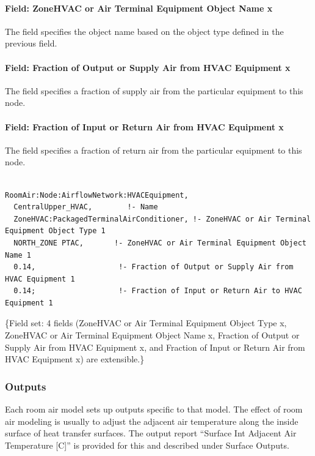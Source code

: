 \paragraph{Field: ZoneHVAC or Air Terminal Equipment Object Name x}\label{field-zonehvac-or-air-terminal-equipment-object-name-x}

The field specifies the object name based on the object type defined in the previous field.

\paragraph{Field: Fraction of Output or Supply Air from HVAC Equipment x}\label{field-fraction-of-output-or-supply-air-from-hvac-equipment-x}

The field specifies a fraction of supply air from the particular equipment to this node.

\paragraph{Field: Fraction of Input or Return Air from HVAC Equipment x}\label{field-fraction-of-input-or-return-air-from-hvac-equipment-x}

The field specifies a fraction of return air from the particular equipment to this node.

\begin{lstlisting}

RoomAir:Node:AirflowNetwork:HVACEquipment,
  CentralUpper_HVAC,        !- Name
  ZoneHVAC:PackagedTerminalAirConditioner, !- ZoneHVAC or Air Terminal Equipment Object Type 1
  NORTH_ZONE PTAC,       !- ZoneHVAC or Air Terminal Equipment Object Name 1
  0.14,                   !- Fraction of Output or Supply Air from HVAC Equipment 1 
  0.14;                   !- Fraction of Input or Return Air to HVAC Equipment 1
\end{lstlisting}

\{Field set: 4 fields (ZoneHVAC or Air Terminal Equipment Object Type x, ZoneHVAC or Air Terminal Equipment Object Name x, Fraction of Output or Supply Air from HVAC Equipment x, and Fraction of Input or Return Air from HVAC Equipment x) are extensible.\}

\subsubsection{Outputs}\label{outputs-1-023}

Each room air model sets up outputs specific to that model. The effect of room air modeling is usually to adjust the adjacent air temperature along the inside surface of heat transfer surfaces. The output report ``Surface Int Adjacent Air Temperature {[}C{]}'' is provided for this and described under Surface Outputs.

